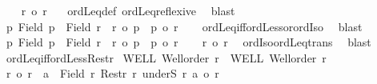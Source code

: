 \begin{isabellebody}
\isanewline
\ \ \isamarkupfalse%
\ {\isachardoublequoteopen}r\ {\isasymle}o\ r{\isachardoublequoteclose}\ \isamarkupfalse%
\ {\isacharasterisk}{\kern0pt}\ ordLeq{\isacharunderscore}{\kern0pt}def\ ordLeq{\isacharunderscore}{\kern0pt}reflexive\ \isamarkupfalse%
\ blast\isanewline
\ \ \isamarkupfalse%
\ \isamarkupfalse%
\ {\isachardoublequoteopen}{\isasymexists}p{\isachardot}{\kern0pt}\ Field\ p\ {\isasymle}\ Field\ r\ {\isasymand}\ r{\isacharprime}{\kern0pt}\ {\isacharequal}{\kern0pt}o\ p\ {\isasymand}\ p\ {\isasymle}o\ r{\isachardoublequoteclose}\isanewline
\ \ \isamarkupfalse%
\ ordLeq{\isacharunderscore}{\kern0pt}iff{\isacharunderscore}{\kern0pt}ordLess{\isacharunderscore}{\kern0pt}or{\isacharunderscore}{\kern0pt}ordIso\ \isamarkupfalse%
\ blast\isanewline
{}\isamarkupfalse%
\isanewline
\ \ \isamarkupfalse%
\ {\isachardoublequoteopen}{\isasymexists}p{\isachardot}{\kern0pt}\ Field\ p\ {\isasymle}\ Field\ r\ {\isasymand}\ r{\isacharprime}{\kern0pt}\ {\isacharequal}{\kern0pt}o\ p\ {\isasymand}\ p\ {\isasymle}o\ r{\isachardoublequoteclose}\isanewline
\ \ \isamarkupfalse%
\ {\isachardoublequoteopen}r{\isacharprime}{\kern0pt}\ {\isasymle}o\ r{\isachardoublequoteclose}\ \isamarkupfalse%
\ ordIso{\isacharunderscore}{\kern0pt}ordLeq{\isacharunderscore}{\kern0pt}trans\ \isamarkupfalse%
\ blast\isanewline
{}\isamarkupfalse%
%
\endisatagproof
{\isafoldproof}%
%
\isadelimproof
\isanewline
%
\endisadelimproof
\isanewline
{}\isamarkupfalse%
\ ordLeq{\isacharunderscore}{\kern0pt}iff{\isacharunderscore}{\kern0pt}ordLess{\isacharunderscore}{\kern0pt}Restr{\isacharcolon}{\kern0pt}\isanewline
{}\ WELL{\isacharcolon}{\kern0pt}\ {\isachardoublequoteopen}Well{\isacharunderscore}{\kern0pt}order\ r{\isachardoublequoteclose}\ \ WELL{\isacharprime}{\kern0pt}{\isacharcolon}{\kern0pt}\ {\isachardoublequoteopen}Well{\isacharunderscore}{\kern0pt}order\ r{\isacharprime}{\kern0pt}{\isachardoublequoteclose}\isanewline
{}\ {\isachardoublequoteopen}{\isacharparenleft}{\kern0pt}r\ {\isasymle}o\ r{\isacharprime}{\kern0pt}{\isacharparenright}{\kern0pt}\ {\isacharequal}{\kern0pt}\ {\isacharparenleft}{\kern0pt}{\isasymforall}a\ {\isasymin}\ Field\ r{\isachardot}{\kern0pt}\ Restr\ r\ {\isacharparenleft}{\kern0pt}underS\ r\ a{\isacharparenright}{\kern0pt}\ {\isacharless}{\kern0pt}o\ r{\isacharprime}{\kern0pt}{\isacharparenright}{\kern0pt}{\isachardoublequoteclose}\isanewline

\end{isabellebody}
